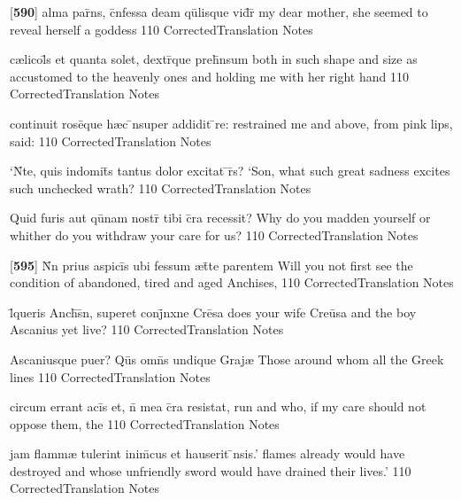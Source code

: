 \latline
  {[\textbf{590}] alma par\={}ns, c\={}nfessa deam qu\={}lisque vid\={}r\={\macron {\i}}}
  { my dear mother, she seemed to reveal herself a goddess }
  {110}
  { CorrectedTranslation }
  { Notes }


\latline
  {c{\ae}licol\={\macron {\i}}s et quanta solet, dextr\={}que preh\={}nsum}
  { both in such shape and size as accustomed to the heavenly ones and holding me with her right hand }
  {110}
  { CorrectedTranslation }
  { Notes }


\latline
  {continuit rose\={}que h{\ae}c \={\macron {\i}}nsuper addidit \={}re:}
  { restrained me and above, from pink lips, said: }
  {110}
  { CorrectedTranslation }
  { Notes }


\latline
  {`N\={}te, quis indomit\={}s tantus dolor excitat \={\macron {\i}}r\={}s?}
  { `Son, what such great sadness excites such unchecked wrath? }
  {110}
  { CorrectedTranslation }
  { Notes }


\latline
  {Quid furis aut qu\={}nam nostr\={\macron {\i}} tibi c\={}ra recessit?}
  { Why do you madden yourself or whither do you withdraw your care for us? }
  {110}
  { CorrectedTranslation }
  { Notes }


\latline
  {[\textbf{595}] N\={}n prius aspici\={}s ubi fessum {\ae}t\={}te parentem}
  { Will you not first see the condition of abandoned, tired and aged Anchises,  }
  {110}
  { CorrectedTranslation }
  { Notes }


\latline
  {l\={\macron {\i}}queris Anch\={\macron {\i}}s\={}n, superet conj\={}nxne Cre\={}sa}
  { does your wife Cre\={u}sa and the boy Ascanius yet live? }
  {110}
  { CorrectedTranslation }
  { Notes }


\latline
  {Ascaniusque puer?  Qu\={}s omn\={\macron {\i}}s undique Graj{\ae}}
  { Those around whom all the Greek lines  }
  {110}
  { CorrectedTranslation }
  { Notes }


\latline
  {circum errant aci\={}s et, n\={\macron {\i}} mea c\={}ra resistat,}
  { run and who, if my care should not oppose them, the  }
  {110}
  { CorrectedTranslation }
  { Notes }


\latline
  {jam flamm{\ae} tulerint inim\={\macron {\i}}cus et hauserit \={}nsis.'}
  { flames already would have destroyed and whose unfriendly sword would have drained their lives.' }
  {110}
  { CorrectedTranslation }
  { Notes }


